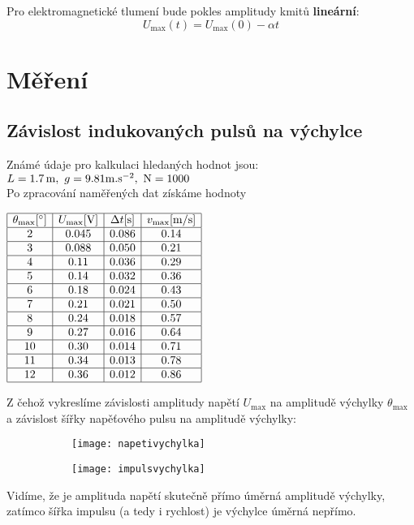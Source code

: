 \documentclass[czech,11pt,a4paper]{article}
\begin{document}
	Pro elektromagnetické tlumení bude pokles amplitudy kmitů \textbf{lineární}:
	\begin{equation}
		U_{\max} (t) = U_{\max}(0) - \alpha t
	\end{equation}
	
	
	
	\section{Měření}
	\subsection{Závislost indukovaných pulsů na výchylce}
	Známé údaje pro kalkulaci hledaných hodnot jsou:\\
	$L = 1.7 \,\mathrm{m}, \,\, g = 9.81 \rm{m.s^{-2}}, \,\, N = 1000 $\\
	Po zpracování naměřených dat získáme hodnoty \\
	\begin{center}
		$
	\begin{array}{|c|c|c|c|}
		\hline \theta_{\max} [^\circ]& U_{\max}[\mathrm{V}] & \Delta t [\mathrm{s}] & v_{\max}[\rm{m/s}] \\
		\hline 2 & 0.045 & 0.086 & 0.14 \\
		\hline 3 & 0.088 & 0.050 & 0.21 \\
		\hline 4 & 0.11 & 0.036 & 0.29 \\
		\hline 5 & 0.14 & 0.032 & 0.36 \\
		\hline 6 & 0.18 & 0.024 & 0.43 \\
		\hline 7 & 0.21 & 0.021 & 0.50 \\
		\hline 8 & 0.24 & 0.018 & 0.57 \\
		\hline 9 & 0.27 & 0.016 & 0.64\\
		\hline 10 & 0.30 & 0.014 & 0.71 \\
		\hline 11 & 0.34 & 0.013 & 0.78 \\
		\hline 12 & 0.36 & 0.012 & 0.86 \\
		\hline
	\end{array}$
	\end{center}
	Z čehož vykreslíme závislosti amplitudy napětí $U_{\max}$ na amplitudě výchylky $\theta_{\max}$ a závislost šířky napěťového pulsu na amplitudě výchylky:
	 \begin{figure}[H]
		\begin{subfigure}{0.5\textwidth}
			\texttt{[image: napetivychylka]} 
		\end{subfigure}
		\begin{subfigure}{0.5\textwidth}
			\texttt{[image: impulsvychylka]}
		\end{subfigure} \end{figure}
	Vidíme, že je amplituda napětí skutečně přímo úměrná amplitudě výchylky, zatímco šířka impulsu (a tedy i rychlost) je výchylce úměrná nepřímo.\\
	
\end{document}
